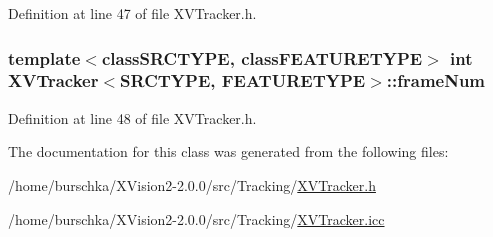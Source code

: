 Definition at line 47 of file XVTracker.h.\label{XVTracker_n3}
\hypertarget{class_XVTracker_n3}{
\subsubsection[frameNum]{\setlength{\rightskip}{0pt plus 5cm}template$<$classSRCTYPE, classFEATURETYPE$>$ int XVTracker$<$SRCTYPE, FEATURETYPE$>$::frame\-Num}}




Definition at line 48 of file XVTracker.h.

The documentation for this class was generated from the following files:\begin{CompactItemize}
\item 
/home/burschka/XVision2-2.0.0/src/Tracking/\hyperlink{XVTracker.h-source}{XVTracker.h}\item 
/home/burschka/XVision2-2.0.0/src/Tracking/\hyperlink{XVTracker.icc-source}{XVTracker.icc}\end{CompactItemize}
